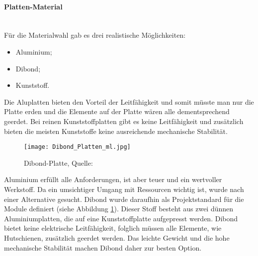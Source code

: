     \paragraph{Platten-Material}\mbox{}\\
    Für die Materialwahl gab es drei realistische Möglichkeiten: 
    \begin{itemize}
        \item Aluminium;
        \item Dibond;
        \item Kunststoff.
    \end{itemize}
    Die Aluplatten bieten den Vorteil der Leitfähigkeit und somit müsste man nur die Platte erden und die Elemente auf der Platte wären alle dementsprechend geerdet. Bei reinen Kunststoffplatten gibt es keine Leitfähigkeit und zusätzlich bieten die meisten Kunststoffe keine ausreichende mechanische Stabilität.\\
    \begin{figure}[H]
        \centering
        \texttt{[image: Dibond\_Platten\_ml.jpg]}
        \caption{Dibond-Platte, Quelle: \cite{Dibond-Platte}}
        \label{fig:Dibond-Platte}
    \end{figure}
    Aluminium erfüllt alle Anforderungen, ist aber teuer und ein wertvoller Werkstoff. Da ein umsichtiger Umgang mit Ressourcen wichtig ist, wurde nach einer Alternative gesucht. Dibond wurde daraufhin als Projektstandard für die Module definiert (siehe Abbildung \ref{fig:Dibond-Platte}). Dieser Stoff besteht aus zwei dünnen Aluminiumplatten, die auf eine Kunststoffplatte aufgepresst werden. Dibond bietet keine elektrische Leitfähigkeit, folglich müssen alle Elemente, wie Hutschienen, zusätzlich geerdet werden. Das leichte Gewicht und die hohe mechanische Stabilität machen Dibond daher zur besten Option.

